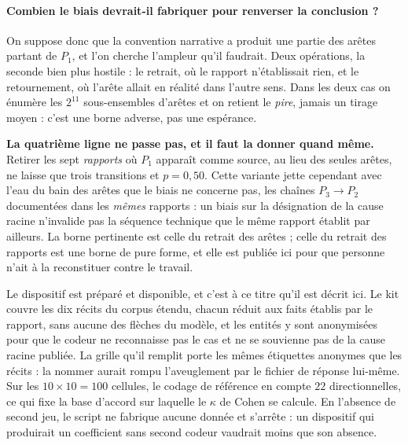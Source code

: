 \paragraph{Combien le biais devrait-il fabriquer pour renverser la conclusion ?} On suppose donc
que la convention narrative a produit une partie des arêtes partant de $P_1$, et l'on cherche
l'ampleur qu'il faudrait. Deux opérations, la seconde bien plus hostile : le retrait,
où le rapport n'établissait rien, et le retournement, où l'arête allait en réalité dans
l'autre sens. Dans les deux cas on énumère les $2^{11}$ sous-ensembles d'arêtes et on retient le
\emph{pire}, jamais un tirage moyen : c'est une borne adverse, pas une espérance.

\begin{attention}
\textbf{La quatrième ligne ne passe pas, et il faut la donner quand même.} Retirer les sept
\emph{rapports} où $P_1$ apparaît comme source, au lieu des seules arêtes, ne laisse que trois
transitions et $p = 0{,}50$. Cette variante jette cependant avec l'eau du bain des arêtes que le
biais ne concerne pas, les chaînes $P_3\to P_2$ documentées dans les \emph{mêmes} rapports : un
biais sur la désignation de la cause racine n'invalide pas la séquence technique que le même
rapport établit par ailleurs. La borne pertinente est celle du retrait des arêtes ; celle du
retrait des rapports est une borne de pure forme, et elle est publiée ici pour que personne
n'ait à la reconstituer contre le travail.
\end{attention}

Le dispositif est préparé et disponible, et c'est à ce titre qu'il est décrit ici. Le
kit couvre les dix récits du corpus étendu, chacun réduit aux faits établis par le
rapport, sans aucune des flèches du modèle, et les entités y sont anonymisées pour que le codeur ne
reconnaisse pas le cas et ne se souvienne pas de la cause racine publiée. La grille qu'il remplit
porte les mêmes étiquettes anonymes que les récits : la nommer aurait rompu l'aveuglement par le
fichier de réponse lui-même. Sur les $10 \times 10 = 100$ cellules, le codage de référence en
compte $22$ directionnelles, ce qui fixe la base d'accord sur laquelle le $\kappa$ de Cohen se
calcule. En l'absence de second jeu, le script ne fabrique aucune donnée et s'arrête :
un dispositif qui produirait un coefficient sans second codeur vaudrait moins que son absence.

